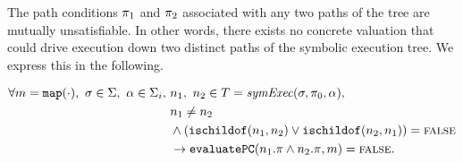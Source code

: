 \begin{property}
  \label{prop:kingunique}
The path conditions $\pi_1$ and $\pi_2$ associated with any two paths of the
tree are mutually unsatisfiable. In other words, there exists no concrete
valuation that could drive execution down two distinct paths of the symbolic
execution tree. We express this in the following.

\begin{align*}
\forall m = \mathtt{map(\cdot)},~\sigma \in \Sigma,~\alpha \in
\Sigma_i,~& n_1,~ n_2 \in T =
\mathit{symExec}(\sigma,\pi_0,\alpha), \\
& n_1 \neq n_2 \\
&  \wedge
(\mathtt{ischildof}(n_1, n_2) \vee  \mathtt{ischildof}(n_2, n_1))= \mathtt{\textsc{false}} \\
&\rightarrow \mathtt{evaluatePC}(n_1.\pi \wedge n_2.\pi,m) = \mathtt{\textsc{false}}.
\end{align*}

\end{property}

